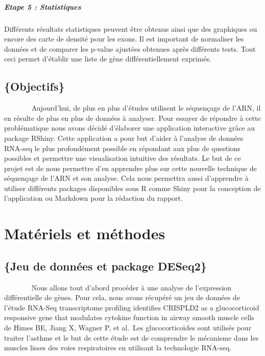 \documentclass[
  12pt,
]{article}
\begin{document}
\hypertarget{etape-5-statistiques}{%
\subparagraph{Etape 5 : Statistiques}\label{etape-5-statistiques}}

Différents résultats statistiques peuvent être obtenus ainsi que des
graphiques ou encore des carte de densité pour les exons. Il est
important de normaliser les données et de comparer les p-value ajustées
obtenues après différents tests. Tout ceci permet d'établir une liste de
gène différentiellement exprimés.

\hypertarget{objectifs}{%
\subsection{\texorpdfstring{\large\{Objectifs\}}{\{Objectifs\}}}\label{objectifs}}

~~~~~~~ Aujourd'hui, de plus en plus d'études utilisent le séquençage de
l'ARN, il en résulte de plus en plus de données à analyser. Pour essayer
de répondre à cette problématique nous avons décidé d'élaborer une
application interactive grâce au package RShiny. Cette application a
pour but d'aider à l'analyse de données RNA-seq le plus profondément
possible en répondant aux plus de questions possibles et permettre une
visualisation intuitive des résultats. Le but de ce projet est de nous
permettre d'en apprendre plus sur cette nouvelle technique de séquençage
de l'ARN et son analyse. Cela nous permettra aussi d'apprendre à
utiliser différents packages disponibles sous R comme Shiny pour la
conception de l'application ou Markdown pour la rédaction du rapport.

\newpage

\hypertarget{matuxe9riels-et-muxe9thodes}{%
\section{\texorpdfstring{\Large Matériels et
méthodes}{Matériels et méthodes}}\label{matuxe9riels-et-muxe9thodes}}

\hypertarget{jeu-de-donnuxe9es-et-package-deseq2}{%
\subsection{\texorpdfstring{\large\{Jeu de données et package
DESeq2\}}{\{Jeu de données et package DESeq2\}}}\label{jeu-de-donnuxe9es-et-package-deseq2}}

~~~~~~~ Nous allons tout d'abord procéder à une analyse de l'expression
différentielle de gènes. Pour cela, nous avons récupéré un jeu de
données de l'étude RNA-Seq transcriptome profiling identifies CRISPLD2
as a glucocorticoid responsive gene that modulates cytokine function in
airway smooth muscle cells de Himes BE, Jiang X, Wagner P, et al.~Les
glucocorticoïdes sont utilisés pour traiter l'asthme et le but de cette
étude est de comprendre le mécanisme dans les muscles lisses des voies
respiratoires en utilisant la technologie RNA-seq.
\end{document}
